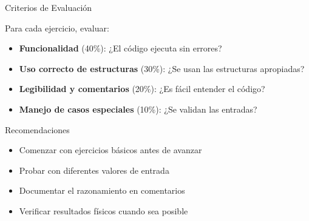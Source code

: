 \documentclass[10pt]{beamer}
\begin{document}
\begin{frame}{Criterios de Evaluación}
  \begin{block}{Para cada ejercicio, evaluar:}
    \begin{itemize}
      \item \textbf{Funcionalidad} (40\%): ¿El código ejecuta sin errores?
      \item \textbf{Uso correcto de estructuras} (30\%): ¿Se usan las estructuras apropiadas?
      \item \textbf{Legibilidad y comentarios} (20\%): ¿Es fácil entender el código?
      \item \textbf{Manejo de casos especiales} (10\%): ¿Se validan las entradas?
    \end{itemize}
  \end{block}
  
  \begin{block}{Recomendaciones}
    \begin{itemize}
      \item Comenzar con ejercicios básicos antes de avanzar
      \item Probar con diferentes valores de entrada
      \item Documentar el razonamiento en comentarios
      \item Verificar resultados físicos cuando sea posible
    \end{itemize}
  \end{block}
\end{frame}
\end{document}
